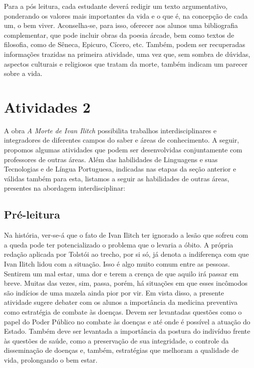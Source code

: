 \documentclass{extarticle}
\begin{document}

Para a pós leitura, cada estudante deverá redigir um texto
argumentativo, ponderando os valores mais importantes da vida e o que é,
na concepção de cada um, o bem viver. Aconselha-se, para isso, oferecer
aos alunos uma bibliografia complementar, que pode incluir obras da
poesia árcade, bem como textos de filosofia, como de Sêneca, Epicuro,
Cícero, etc. Também, podem ser recuperadas informações trazidas na
primeira atividade, uma vez que, sem sombra de dúvidas, aspectos
culturais e religiosos que tratam da morte, também indicam um parecer
sobre a vida.

\section{Atividades 2}


A obra \emph{A Morte de Ivan Ilitch} possibilita trabalhos
interdisciplinares e integradores de diferentes campos do saber e áreas
de conhecimento. A seguir, propomos algumas atividades que podem ser
desenvolvidas conjuntamente com professores de outras áreas. Além das
habilidades de Linguagens e suas Tecnologias e de Língua Portuguesa,
indicadas nas etapas da seção anterior e válidas também para esta,
listamos a seguir as habilidades de outras áreas, presentes na abordagem
interdisciplinar:

\subsection{Pré-leitura}

Na história, ver-se-á que o fato de Ivan Ilitch ter ignorado
a lesão que sofreu com a queda pode ter potencializado o problema que o
levaria a óbito. A própria redação aplicada por Tolstói ao trecho, por
si só, já denota a indiferença com que Ivan Ilitch lidou com a situação.
Isso é algo muito comum entre as pessoas. Sentirem um mal estar, uma dor
e terem a crença de que aquilo irá passar em breve. Muitas das vezes,
sim, passa, porém, há situações em que esses incômodos são indícios de
uma mazela ainda pior por vir. Em vista disso, a presente atividade
sugere debater com os alunos a importância da medicina preventiva como
estratégia de combate às doenças. Devem ser levantadas questões como o
papel do Poder Público no combate às doenças e até onde é possível a
atuação do Estado. Também deve ser levantada a importância da postura do
indivíduo frente às questões de saúde, como a preservação de sua
integridade, o controle da disseminação de doenças e, também,
estratégias que melhoram a qualidade de vida, prolongando o bem estar.
\end{document}
